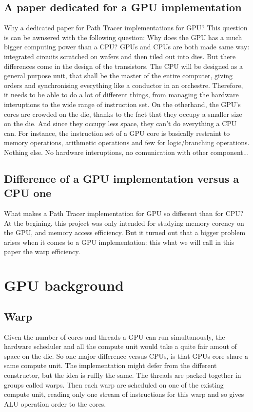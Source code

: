 \documentclass[11pt,twocolumn,a4paper]{article}
\begin{document}
\subsection{A paper dedicated for a GPU implementation}
Why a dedicated paper for Path Tracer implementations for GPU? This question is
can be awnsered with the following question: Why does the GPU has a much bigger
computing power than a CPU? GPUs and CPUs are both made same way:
integrated circuits scratched on wafers and then tiled out
into dies. But there differences come in the design of the transistors. The CPU
will be designed as a general purpose unit, that shall be the master of the
entire computer, giving orders and synchronising everything like a conductor
in an orchestre. Therefore, it needs to be able to do a lot of
different things, from managing the hardware interuptions to the wide range of
instruction set. On the otherhand, the GPU's cores are crowded on the die, thanks
to the fact that
they occupy a smaller size on the die. And since they occupy less space, they
can't do everything a CPU can. For instance, the instruction set of a GPU core
is basically restraint to memory
operations, arithmetic operations and few for logic/branching operations. Nothing else.
No hardware interuptions, no comunication with other component...

\subsection{Difference of a GPU implementation versus a CPU one}
What makes a Path Tracer implementation for GPU so different than for CPU? At
the begining, this project was only intended for studying memory corency on the
GPU, and memory access efficiency.
But it turned out that a bigger problem arises when it comes to a GPU
implementation: this what we will call in this paper the warp efficiency.

\section{GPU background}
\subsection{Warp}
Given the number of cores and threads a GPU can run simultanously, the hardware
scheduler and all the compute unit would take a quite fair amout of space on the
die. So one major difference versus CPUs, is that GPUs core share a same
compute unit. The implementation might defer from the different constructor, but
the idea is ruffly the same. The threads are packed together in groups called
warps. Then each warp are scheduled on one of the existing compute unit, reading
only one stream of instructions for this warp and so gives ALU operation order
to the cores.
\end{document}
